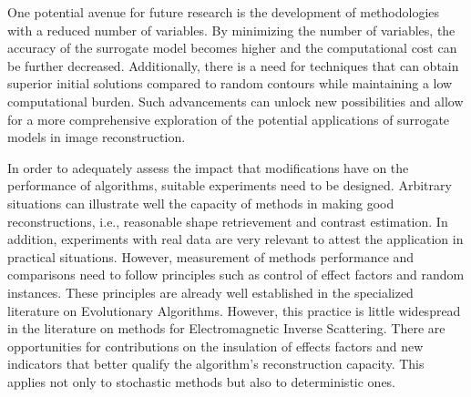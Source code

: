 		One potential avenue for future research is the development of methodologies with a reduced number of variables. By minimizing the number of variables, the accuracy of the surrogate model becomes higher and the computational cost can be further decreased. Additionally, there is a need for techniques that can obtain superior initial solutions compared to random contours while maintaining a low computational burden. Such advancements can unlock new possibilities and allow for a more comprehensive exploration of the potential applications of surrogate models in image reconstruction.
		
		In order to adequately assess the impact that modifications have on the performance of algorithms, suitable experiments need to be designed. Arbitrary situations can illustrate well the capacity of methods in making good reconstructions, i.e., reasonable shape retrievement and contrast estimation. In addition, experiments with real data are very relevant to attest the application in practical situations. However, measurement of methods performance and comparisons need to follow principles such as control of effect factors and random instances. These principles are already well established in the specialized literature on Evolutionary Algorithms. However, this practice is little widespread in the literature on methods for Electromagnetic Inverse Scattering. There are opportunities for contributions on the insulation of effects factors and new indicators that better qualify the algorithm's reconstruction capacity. This applies not only to stochastic methods but also to deterministic ones.
	
